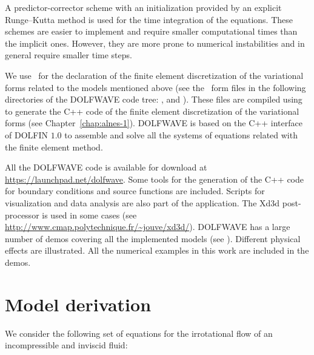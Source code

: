A predictor-corrector scheme with an initialization provided by an
explicit Runge--Kutta method is used for the time integration of the
equations.  These schemes are easier to implement and require smaller
computational times than the implicit ones.  However, they are more
prone to numerical instabilities and in general require smaller time
steps.

We use \ufl\ for the declaration of the finite element discretization
of the variational forms related to the models mentioned above (see
the \ufl\ form files in the following directories of the DOLFWAVE code
tree: ,  and
).  These files are compiled using \ffc to
generate the C++ code of the finite element discretization of the
variational forms (see Chapter~\ref{chap:alnes-1}).  DOLFWAVE is based
on the C++ interface of DOLFIN $1.0$ to assemble and solve all the
systems of equations related with the finite element method.

All the DOLFWAVE code is available for download at
\url{https://launchpad.net/dolfwave}. Some tools for the generation of
the C++ code for boundary conditions and source functions are
included. Scripts for visualization and data analysis are also part of
the application. The Xd3d post-processor is used in some cases (see
\url{http://www.cmap.polytechnique.fr/~jouve/xd3d/}).  DOLFWAVE has a
large number of demos covering all the implemented models (see
). Different physical effects are illustrated.  All
the numerical examples in this work are included in the demos.

\section{Model derivation}
\label{sec:lopes:modelderivation}

We consider the following set of equations for the irrotational flow
of an incompressible and inviscid fluid:

